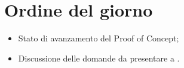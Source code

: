 \section{Ordine del giorno}
\begin{itemize}
\item Stato di avanzamento del Proof of Concept;
\item Discussione delle domande da presentare a \Proponente.
\end{itemize}